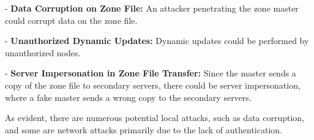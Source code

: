 - \textbf{Data Corruption on Zone File:} An attacker penetrating the zone master could corrupt data on the zone file.

- \textbf{Unauthorized Dynamic Updates:} Dynamic updates could be performed by unauthorized nodes.

- \textbf{Server Impersonation in Zone File Transfer:} Since the master sends a copy of the zone file to secondary servers, there could be server impersonation, where a fake master sends a wrong copy to the secondary servers.

As evident, there are numerous potential local attacks, such as data corruption, and some are network attacks primarily due to the lack of authentication.
